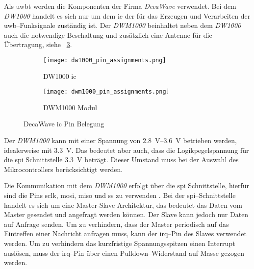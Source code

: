 \begin{comment}
------------------------------------------------------------------------------------------
TODO: Wie wird der Vorwiderstand berechnet? ca. 10mA bei 1.8V, R=(U_0-U_LED)/I_LED

LED Vorwiderstand berechnen
	- https://www.youtube.com/watch?v=iNZj91TSRUg
	- DW1000 Datasheet - 5.9 General Purpose Input Output (GPIO)
\end{comment}
\subsubsection{}\label{subsec:uwb_transceiver}

Als \Gls{uwbt} werden die Komponenten der Firma \textit{DecaWave} verwendet. Bei dem \textit{DW1000} handelt es sich nur um dem \Gls{ic} der für das Erzeugen und Verarbeiten der \gls{uwb}--Funksignale zuständig ist. Der \textit{DWM1000} beinhaltet neben dem \textit{DW1000} auch die notwendige Beschaltung und zusätzlich eine Antenne für die Übertragung, siehe \figurename~\ref{fig:pin_assignment}.

\begin{figure}
	\begin{subfigure}[t]{0.4\textwidth}
		\texttt{[image: dw1000\_pin\_assignments.png]}
		\caption{DW1000 \gls{ic}}
		\label{fig:dw1000_pin_assignments}
	\end{subfigure}
	\hfill
	\begin{subfigure}[t]{0.4\textwidth}
		\texttt{[image: dwm1000\_pin\_assignments.png]}
		\caption{DWM1000 Modul}
		\label{fig:dwm1000_pin_assignments}
	\end{subfigure}
	\caption{DecaWave \gls{ic} Pin Belegung}
	\label{fig:pin_assignment}
\end{figure}

Der \textit{DWM1000} kann mit einer Spannung von \SIrange{2.8}{3.6}{\volt}\cite{decawave2016dwm1kdatasheet} betrieben werden, idealerweise mit \SI{3.3}{\volt}. Das bedeutet aber auch, dass die Logikpegelspannung für die \gls{spi} Schnittstelle \SI{3.3}{\volt} beträgt. Dieser Umstand muss bei der Auswahl des Mikrocontrollers berücksichtigt werden.

Die Kommunikation mit dem \textit{DWM1000} erfolgt über die \gls{spi} Schnittstelle, hierfür sind die Pins \gls{sclk}, \gls{mosi}, \gls{miso} und \gls{ss} zu verwenden \cite{decawave2016dwm1kdatasheet}. Bei der \gls{spi}--Schnittstelle handelt es sich um eine Master-Slave Architektur, das bedeutet das Daten vom Master gesendet und angefragt werden können. Der Slave kann jedoch nur Daten auf Anfrage senden. Um zu verhindern, dass der Master periodisch auf das Eintreffen einer Nachricht anfragen muss, kann der \gls{irq}--Pin des Slaves verwendet werden. Um zu verhindern das kurzfristige Spannungsspitzen einen Interrupt auslösen, muss der \gls{irq}--Pin über einen Pulldown--Widerstand auf Masse gezogen werden.

